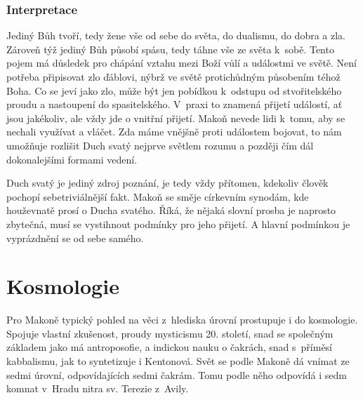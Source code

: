 \subsubsection*{Interpretace}

Jediný Bůh tvoří, tedy žene vše od sebe do světa, do dualismu, do dobra a zla.
Zároveň týž jediný Bůh působí spásu, tedy táhne vše ze světa k~sobě. Tento pojem
má důsledek pro chápání vztahu mezi Boží vůlí a událostmi ve světě. Není potřeba
připisovat zlo ďáblovi, nýbrž ve světě protichůdným působením téhož Boha. Co se
jeví jako zlo, může být jen pobídkou k~odstupu od stvořitelského proudu a
nastoupení do spasitelského. V~praxi to znamená přijetí událostí, ať jsou
jakékoliv, ale vždy jde o vnitřní přijetí. Makoň nevede lidi k~tomu, aby se
nechali využívat a vláčet. Zda máme vnějšně proti událostem bojovat, to nám
umožňuje rozlišit Duch svatý nejprve světlem rozumu a později čím dál
dokonalejšími formami vedení.

Duch svatý je jediný zdroj poznání, je tedy vždy přítomen, kdekoliv člověk
pochopí sebetriviálnější fakt. Makoň se směje
církevním synodám, kde houževnatě prosí o Ducha
svatého. Říká,
že nějaká slovní prosba je naprosto zbytečná, musí se vystihnout podmínky pro
jeho přijetí. A hlavní podmínkou je vyprázdnění se od sebe samého.

\section{Kosmologie}

Pro Makoně typický pohled na věci z~hlediska úrovní prostupuje i do kosmologie.
Spojuje vlastní zkušenost, proudy mysticismu 20. století, snad se společným
základem jako má antroposofie\cite{Bezdek2009thesis}, a indickou nauku o
čakrách\cite{atwell2013osi}, snad s~příměsí kabbalismu, jak to syntetizuje i
Kentonová\cite{kenton2015kabbalistic}. Svět se podle Makoně dá vnímat ze sedmi
úrovní, odpovídajících sedmi čakrám. Tomu podle něho odpovídá i sedm komnat v~Hradu
nitra\cite{teresa1588castillo} sv. Terezie z~Avily.

